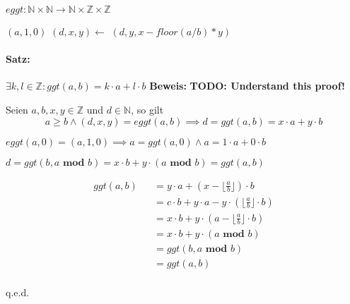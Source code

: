\documentclass[12pt]{scrreprt}
\newcommand{\theorem}[1]{\paragraph{Satz:} #1\newline}
\renewcommand{\mod}{\textbf{ mod }}
\newenvironment{proof}
    {\textbf{Beweis:}\newline\indent}
    {\begin{flushright}q.e.d.\end{flushright}}
\begin{document}
                    $ eggt : \mathbb{N} \times \mathbb{N} \rightarrow \mathbb{N} \times \mathbb{Z} \times \mathbb{Z} $

                    \begin{algorithmic}
                                \State \Return $ (a, 1, 0) $
                            \Else
                                \State $ (d, x, y) \gets $ \Call{eggt}{$ b $, $ a \mod b $}
                                \State \Return $ (d, y, x - floor(a / b) * y) $
                            \EndIf
                        \EndFunction
                    \end{algorithmic}

                    \theorem{$ \exists k, l \in \mathbb{Z} : ggt(a, b) = k \cdot a + l \cdot b $}
                        \begin{proof}
                            \textbf{TODO: Understand this proof!}

                            Seien $ a, b, x, y \in \mathbb{Z} $ und $ d \in \mathbb{N} $, so gilt
                            \[ a \geq b \land (d, x, y) = eggt(a, b) \implies d = ggt(a, b) = x \cdot a + y \cdot b \]

                            $ eggt(a, 0) = (a, 1, 0) \implies a = ggt(a, 0) \land a = 1 \cdot a + 0 \cdot b $

                            $ d = ggt(b, a \mod b) = x \cdot b + y \cdot (a \mod b) = ggt(a, b) $

                            \begin{eqnarray*}
                                     ggt(a, b)
                                && = y \cdot a + (x - \lfloor \frac{a}{b} \rfloor) \cdot b                  \\
                                && = c \cdot b + y \cdot a - y \cdot (\lfloor \frac{a}{b} \rfloor \cdot b)  \\
                                && = x \cdot b + y \cdot (a - \lfloor \frac{a}{b} \rfloor \cdot b)          \\
                                && = x \cdot b + y \cdot (a \mod b)                                         \\
                                && = ggt(b, a \mod b)                                                       \\
                                && = ggt(a, b)                                                              \\
                            \end{eqnarray*}
                        \end{proof}
\end{document}
